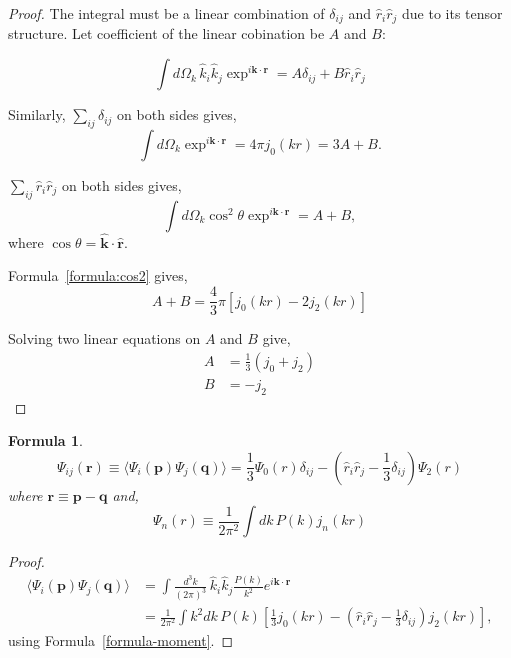 \documentclass[a4paper,11pt]{article}
\newtheorem{formula}{Formula}[section]
\begin{document}
\begin{proof}
  The integral must be a linear combination of $\delta_{ij}$ and
  $\hat{r}_i \hat{r}_j$ due to its tensor structure. Let coefficient
  of the linear cobination be $A$ and $B$:

  \begin{equation}
    \int\! d\Omega_k \, \hat{k}_i \hat{k}_j \exp^{i\bm{k}\cdot\bm{r}}
    = A \delta_{ij} + B \hat{r}_i \hat{r}_j
  \end{equation}

  Similarly, $\sum_{ij} \delta_{ij}$ on both sides gives,
  \begin{equation}
    \int \! d\Omega_k \exp^{i\bm{k}\cdot\bm{r}} = 4 \pi j_0(kr)
    = 3 A + B.
  \end{equation}

  $\sum_{ij} \hat{r}_i \hat{r}_j$ on both sides gives,
  \begin{equation}
    \int \! d\Omega_k \cos^2 \theta \exp^{i\bm{k}\cdot\bm{r}}
      = A + B,
  \end{equation}
  where $\cos\theta = \hat{\bm{k}} \cdot \hat{\bm{r}}$.

  Formula~\ref{formula:cos2} gives,
  \begin{equation}
    A + B = \frac{4}{3}\pi \left[ j_0(kr) - 2 j_2(kr) \right]
  \end{equation}

  Solving two linear equations on $A$ and $B$ give,
  \begin{align}
    A &= \frac{1}{3} (j_0 + j_2)\\
    B &= - j_2
  \end{align}    
\end{proof}

%
%
\begin{formula}
  \begin{equation}
    \Psi_{ij} (\bm{r}) \equiv \langle \Psi_i(\bm{p}) \Psi_j(\bm{q}) \rangle =
    \frac{1}{3} \Psi_0(r) \delta_{ij} - \left( \hat{r}_i \hat{r}_j - \frac{1}{3} \delta_{ij} \right) \Psi_2(r)
  \end{equation}
  where $\bm{r} \equiv \bm{p} - \bm{q}$ and,
  \begin{equation}
    \Psi_n(r) \equiv \frac{1}{2\pi^2} \int \! dk \, P(k) j_n(kr)
  \end{equation}
\end{formula}

\begin{proof}
  \begin{equation}
    \begin{split}
      \langle \Psi_i(\bm{p}) \Psi_j(\bm{q}) \rangle &=
      \int \! \frac{d^3 k}{(2\pi)^3} \,
        \hat{k}_i \hat{k}_j \frac{P(k)}{k^2} e^{i\bm{k}\cdot\bm{r}}\\
      &= \frac{1}{2\pi^2} \int\! k^2 dk \, P(k) \left[
         \frac{1}{3} j_0(kr) - \left( \hat{r}_i \hat{r}_j - \frac{1}{3}\delta_{ij} \right) j_2(kr) \right],
    \end{split}
  \end{equation}
  using Formula~\ref{formula-moment}.
\end{proof}
\end{document}
